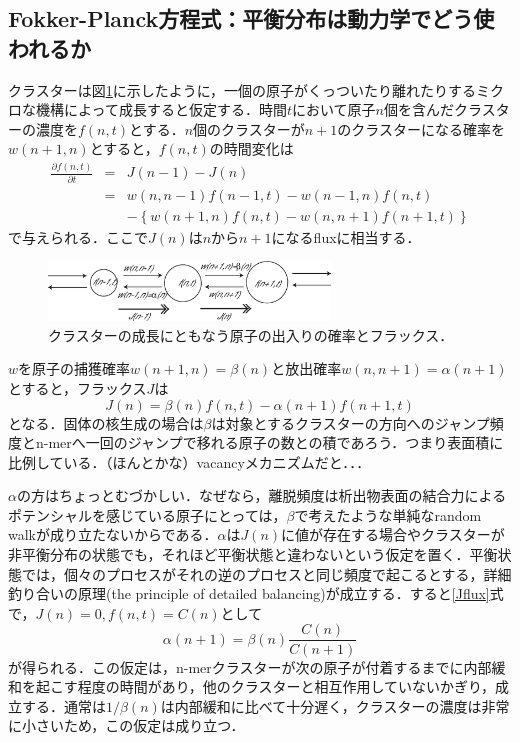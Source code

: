 \documentclass[a4j,10pt]{jarticle}
\begin{document}
\subsection{Fokker-Planck方程式：平衡分布は動力学でどう使われるか}
クラスターは図\ref{ClusterGrowth}に示したように，一個の原子がくっついたり離れたりするミクロな機構によって成長すると仮定する．時間$t$において原子$n$個を含んだクラスターの濃度を$f(n,t)$とする．$n$個のクラスターが$n+1$のクラスターになる確率を$w(n+1,n)$とすると，$f(n,t)$の時間変化は
\begin{eqnarray}
\frac{\partial f(n,t)}{\partial t} &=& J(n-1) - J(n) \nonumber \\
&=&w(n,n-1)f(n-1,t) - w(n-1,n)f(n,t) \nonumber \\
& &- \left\{w(n+1,n)f(n,t) - w(n,n+1)f(n+1,t) \right\}
\label{dfdt}
\end{eqnarray}
で与えられる．ここで$J(n)$は$n$から$n+1$になるfluxに相当する．
\begin{figure}\begin{center}
\includegraphics[width=75mm]{./figs/ClusterGrowth.eps}
\caption{クラスターの成長にともなう原子の出入りの確率とフラックス．}
\label{ClusterGrowth}
\end{center}\end{figure}

$w$を原子の捕獲確率$w(n+1,n)=\beta(n)$と放出確率$w(n,n+1)=\alpha(n+1)$とすると，フラックス$J$は
\begin{equation}
J(n) = \beta(n) f(n,t) - \alpha(n+1) f(n+1,t)
\label{Jflux}
\end{equation}
となる．固体の核生成の場合は$\beta$は対象とするクラスターの方向へのジャンプ頻度とn-merへ一回のジャンプで移れる原子の数との積であろう．つまり表面積に比例している．（ほんとかな）vacancyメカニズムだと．．．

$\alpha$の方はちょっとむづかしい．なぜなら，離脱頻度は析出物表面の結合力によるポテンシャルを感じている原子にとっては，$\beta$で考えたような単純なrandom walkが成り立たないからである．$\alpha$は$J(n)$に値が存在する場合やクラスターが非平衡分布の状態でも，それほど平衡状態と違わないという仮定を置く．平衡状態では，個々のプロセスがそれの逆のプロセスと同じ頻度で起こるとする，詳細釣り合いの原理(the principle of detailed balancing)が成立する．すると\ref{Jflux}式で，$J(n)=0,f(n,t)=C(n)$として
\begin{equation}
\alpha(n+1)=\beta(n) \frac{C(n)}{C(n+1)}
\label{alpha}
\end{equation}
が得られる．この仮定は，n-merクラスターが次の原子が付着するまでに内部緩和を起こす程度の時間があり，他のクラスターと相互作用していないかぎり，成立する．通常は$1/\beta(n)$は内部緩和に比べて十分遅く，クラスターの濃度は非常に小さいため，この仮定は成り立つ．
\end{document}
